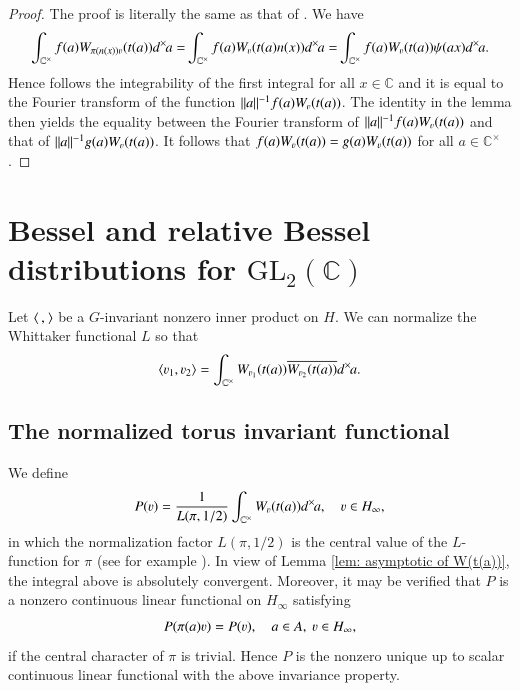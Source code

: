 \documentclass{amsproc}
\newcommand{\BC}{{\mathbb {C}}} \newcommand{\BD}{{\mathbb {D}}}
\newcommand{\GL}{{\mathrm {GL}}} \newcommand{\PGL}{{\mathrm {PGL}}}
\def\-{^{-1}}
\def\BCx{\BC^{\times}}
\def\shskip{\hskip 0.5 pt}
\def\dx{d^{\times} \hskip -1 pt}
\theoremstyle{plain}
\numberwithin{equation}{section}
\begin{document}
\begin{proof}
	The proof is literally the same as that of \cite[Lemma 2.1]{BaruchMao-Real}. We have
	\begin{align*}
	\int_{\BCx} f(a)W_{\pi(n(x))\varv}(t(a))\dx  a  = \hskip -1 pt \int_{\BCx} f(a)W_{ \varv}(t(a) n(x))\dx  a  = \hskip -1 pt \int_{\BCx} f(a)W_{ \varv}(t(a) ) \psi (ax) \dx  a.
	\end{align*}
	Hence follows the integrability of the first integral for all $x \in \BC$ and it is equal to the Fourier transform of the function $\|a\|\- f(a)W_{ \varv}(t(a) ) $. The identity in the lemma then yields the equality between the Fourier transform of $\|a\|\- f(a)W_{ \varv}(t(a) ) $ and that of $\|a\|\- g (a)W_{ \varv}(t(a) ) $. It follows that $f(a)W_\varv(t(a))=g(a)W_\varv(t(a))$ for all $a\in \BCx$.
\end{proof}

	
	\section{Bessel and relative Bessel distributions for $\GL_2 (\BC)$}\label{sec: distributions}
	
	
	Let $\langle \,  ,\shskip \rangle $ be a $G$-invariant nonzero inner product on $H$. We can
	normalize the Whittaker functional $L$ so that
	\begin{equation}\label{eq: inner product}
	\langle \varv_1,\varv_2\rangle =\int_{\BCx}W_{\varv_1}(t(a))\overline
	{W_{\varv_2}(t(a))}\dx a.
	\end{equation}
	
	\subsection{The normalized torus invariant functional}
	 We define
	\begin{equation}\label{def: P}
	P(\varv)=\frac{1}{L(\pi,1/2)}\int_{\BCx} W_\varv(t(a))\dx a, \hskip 10 pt \varv \in H_{\infty},
	\end{equation}
	in which the normalization factor $L(\pi, 1/2)$ is the central value of the $L$-function for $\pi$ (see for example \cite[\S 4]{Knapp}).
In view of Lemma \ref{lem: asymptotic of W(t(a))}, the integral above is absolutely convergent. Moreover, it may be verified that $P$ is a  nonzero continuous linear
	functional on $H_\infty$ satisfying
	\[
	P(\pi(a)\varv)= P(\varv), \hskip 10 pt a \in A, \ \varv\in H_\infty,
	\]
	 if the central character of $\pi $ is trivial.
	Hence $P$ is the nonzero   unique up to scalar continuous linear
	functional with the above invariance property.
	
\end{document}
